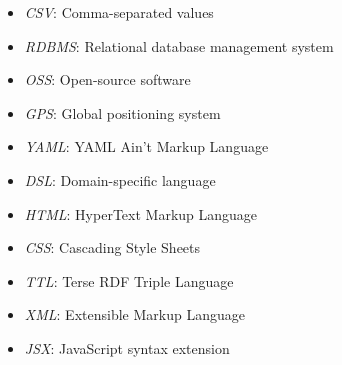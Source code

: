 \documentclass[12pt,a4paper]{report}
\let\openright=\clearpage
\begin{document}



\tableofcontents















\listoffigures

\listoftables

\begin{itemize}
\item \emph{CSV}: Comma-separated values
\item \emph{RDBMS}: Relational database management system
\item \emph{OSS}: Open-source software
\item \emph{GPS}: Global positioning system
\item \emph{YAML}: YAML Ain't Markup Language
\item \emph{DSL}: Domain-specific language
\item \emph{HTML}: HyperText Markup Language
\item \emph{CSS}: Cascading Style Sheets
\item \emph{TTL}: Terse RDF Triple Language
\item \emph{XML}: Extensible Markup Language
\item \emph{JSX}: JavaScript syntax extension
\end{itemize}


\openright
\end{document}
